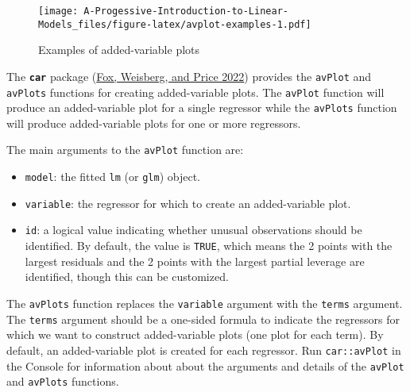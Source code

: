 \documentclass[
]{book}
\theoremstyle{definition}
\theoremstyle{definition}
\theoremstyle{definition}
\theoremstyle{definition}
\theoremstyle{remark}
\begin{document}
\begin{figure}
\centering
\texttt{[image: A-Progessive-Introduction-to-Linear-Models\_files/figure-latex/avplot-examples-1.pdf]}
\caption{\label{fig:avplot-examples}Examples of added-variable plots}
\end{figure}

The \textbf{\texttt{car}} package (\protect\hyperlink{ref-R-car}{Fox, Weisberg, and Price 2022}) provides the \texttt{avPlot} and \texttt{avPlots}
functions for creating added-variable plots. The \texttt{avPlot} function will
produce an added-variable plot for a single regressor while the
\texttt{avPlots} function will produce added-variable plots for one or more
regressors.

The main arguments to the \texttt{avPlot} function are:

\begin{itemize}
\item
  \texttt{model}: the fitted \texttt{lm} (or \texttt{glm}) object.
\item
  \texttt{variable}: the regressor for which to create an added-variable
  plot.
\item
  \texttt{id}: a logical value indicating whether unusual observations should
  be identified. By default, the value is \texttt{TRUE}, which means the 2
  points with the largest residuals and the 2 points with the largest
  partial leverage are identified, though this can be customized.
\end{itemize}

The \texttt{avPlots} function replaces the \texttt{variable} argument with the \texttt{terms}
argument. The \texttt{terms} argument should be a one-sided formula to indicate
the regressors for which we want to construct added-variable plots (one
plot for each term). By default, an added-variable plot is created for
each regressor. Run \texttt{car::avPlot} in the Console for information about
about the arguments and details of the \texttt{avPlot} and \texttt{avPlots} functions.
\end{document}
